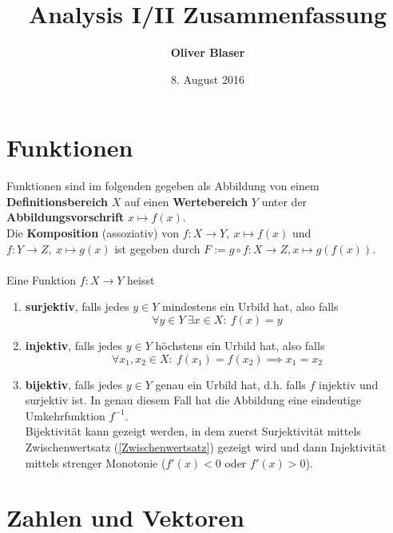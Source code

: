 \documentclass[a4paper,10pt]{scrartcl}
\title{Analysis I/II Zusammenfassung}
\author{\textbf{Oliver Blaser}}
\date{8. August 2016}
\begin{document}
\maketitle
\tableofcontents
\pagebreak 
\section{Funktionen}
Funktionen sind im folgenden gegeben als Abbildung von einem \textbf{Definitionsbereich} $X$ auf einen \textbf{Wertebereich} $Y$ unter der \textbf{Abbildungsvorschrift} $x\mapsto f(x)$. \\
Die \textbf{Komposition} (assoziativ) von $f: X\to Y, \ x \mapsto f(x)$ und $f: Y\to Z, \ x \mapsto g(x)$ ist gegeben durch $F:= g\circ f: X \to Z, x\mapsto g(f(x))$. \\\\
Eine Funktion $f: X\to Y$ heisst
\begin{enumerate}[label = $\circ$]
	\item \textbf{surjektiv}, falls jedes $y\in Y$ mindestens ein Urbild hat, also falls 
	\begin{equation}
		\forall y\in Y\ \exists x \in X:\ f(x)=y	
	\end{equation}
	\item \textbf{injektiv}, falls jedes $y\in Y$ höchstens ein Urbild hat, also falls
	\begin{equation}
		\forall x_1,x_2 \in X : \ f(x_1) = f(x_2) \implies x_1=x_2
	\end{equation}
	\item \textbf{bijektiv}, falls jedes $y\in Y$ genau ein Urbild hat, d.h. falls $f$ injektiv und surjektiv ist. In genau diesem Fall hat die Abbildung eine eindeutige Umkehrfunktion $f^{-1}$.\\
	Bijektivität kann gezeigt werden, in dem zuerst Surjektivität mittels Zwischenwertsatz (\ref{Zwischenwertsatz}) gezeigt wird und dann Injektivität mittels strenger Monotonie ($f'(x) < 0$ oder $f'(x)> 0$).
\end{enumerate}

\section{Zahlen und Vektoren}
\end{document}
